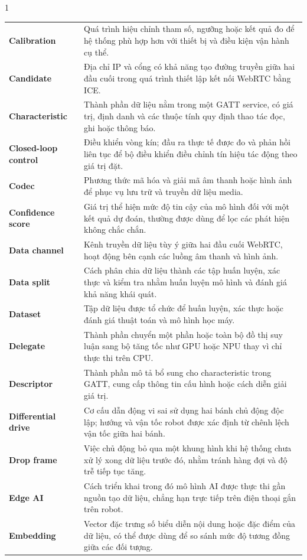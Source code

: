 \begin{spacing}{1}
\begin{longtable}{@{}>{\bfseries\color{HCMUTDarkBlue}}p{4.1cm}p{10.7cm}@{}}
  Calibration
    & Quá trình hiệu chỉnh tham số, ngưỡng hoặc kết quả đo để hệ thống phù hợp hơn với thiết bị và điều kiện vận hành cụ thể. \\
  Candidate
    & Địa chỉ IP và cổng có khả năng tạo đường truyền giữa hai đầu cuối trong quá trình thiết lập kết nối WebRTC bằng ICE. \\
  Characteristic
    & Thành phần dữ liệu nằm trong một GATT service, có giá trị, định danh và các thuộc tính quy định thao tác đọc, ghi hoặc thông báo. \\
  Closed-loop control
    & Điều khiển vòng kín; đầu ra thực tế được đo và phản hồi liên tục để bộ điều khiển điều chỉnh tín hiệu tác động theo giá trị đặt. \\
  Codec
    & Phương thức mã hóa và giải mã âm thanh hoặc hình ảnh để phục vụ lưu trữ và truyền dữ liệu media. \\
  Confidence score
    & Giá trị thể hiện mức độ tin cậy của mô hình đối với một kết quả dự đoán, thường được dùng để lọc các phát hiện không chắc chắn. \\
  Data channel
    & Kênh truyền dữ liệu tùy ý giữa hai đầu cuối WebRTC, hoạt động bên cạnh các luồng âm thanh và hình ảnh. \\
  Data split
    & Cách phân chia dữ liệu thành các tập huấn luyện, xác thực và kiểm tra nhằm huấn luyện mô hình và đánh giá khả năng khái quát. \\
  Dataset
    & Tập dữ liệu được tổ chức để huấn luyện, xác thực hoặc đánh giá thuật toán và mô hình học máy. \\
  Delegate
    & Thành phần chuyển một phần hoặc toàn bộ đồ thị suy luận sang bộ tăng tốc như GPU hoặc NPU thay vì chỉ thực thi trên CPU. \\
  Descriptor
    & Thành phần mô tả bổ sung cho characteristic trong GATT, cung cấp thông tin cấu hình hoặc cách diễn giải giá trị. \\
  Differential drive
    & Cơ cấu dẫn động vi sai sử dụng hai bánh chủ động độc lập; hướng và vận tốc robot được xác định từ chênh lệch vận tốc giữa hai bánh. \\
  Drop frame
    & Việc chủ động bỏ qua một khung hình khi hệ thống chưa xử lý xong dữ liệu trước đó, nhằm tránh hàng đợi và độ trễ tiếp tục tăng. \\
  Edge AI
    & Cách triển khai trong đó mô hình AI được thực thi gần nguồn tạo dữ liệu, chẳng hạn trực tiếp trên điện thoại gắn trên robot. \\
  Embedding
    & Vector đặc trưng số biểu diễn nội dung hoặc đặc điểm của dữ liệu, có thể được dùng để so sánh mức độ tương đồng giữa các đối tượng. \\

\end{longtable}
\end{spacing}
